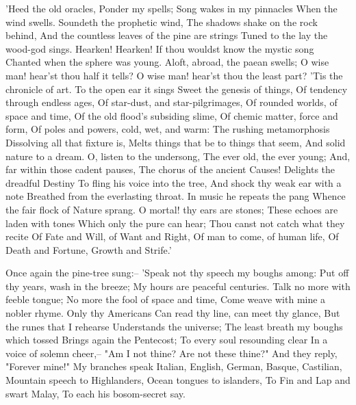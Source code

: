 'Heed the old oracles,
Ponder my spells;
Song wakes in my pinnacles
When the wind swells.
Soundeth the prophetic wind,
The shadows shake on the rock behind,
And the countless leaves of the pine are strings
Tuned to the lay the wood-god sings.
  Hearken! Hearken!
If thou wouldst know the mystic song
Chanted when the sphere was young.
Aloft, abroad, the paean swells;
O wise man! hear'st thou half it tells?
O wise man! hear'st thou the least part?
'Tis the chronicle of art.
To the open ear it sings
Sweet the genesis of things,
Of tendency through endless ages,
Of star-dust, and star-pilgrimages,
Of rounded worlds, of space and time,
Of the old flood's subsiding slime,
Of chemic matter, force and form,
Of poles and powers, cold, wet, and warm:
The rushing metamorphosis
Dissolving all that fixture is,
Melts things that be to things that seem,
And solid nature to a dream.
O, listen to the undersong,
The ever old, the ever young;
And, far within those cadent pauses,
The chorus of the ancient Causes!
Delights the dreadful Destiny
To fling his voice into the tree,
And shock thy weak ear with a note
Breathed from the everlasting throat.
In music he repeats the pang
Whence the fair flock of Nature sprang.
O mortal! thy ears are stones;
These echoes are laden with tones
Which only the pure can hear;
Thou canst not catch what they recite
Of Fate and Will, of Want and Right,
Of man to come, of human life,
Of Death and Fortune, Growth and Strife.'

  Once again the pine-tree sung:--
'Speak not thy speech my boughs among:
Put off thy years, wash in the breeze;
My hours are peaceful centuries.
Talk no more with feeble tongue;
No more the fool of space and time,
Come weave with mine a nobler rhyme.
Only thy Americans
Can read thy line, can meet thy glance,
But the runes that I rehearse
Understands the universe;
The least breath my boughs which tossed
Brings again the Pentecost;
To every soul resounding clear
In a voice of solemn cheer,--
"Am I not thine? Are not these thine?"
And they reply, "Forever mine!"
My branches speak Italian,
English, German, Basque, Castilian,
Mountain speech to Highlanders,
Ocean tongues to islanders,
To Fin and Lap and swart Malay,
To each his bosom-secret say.

